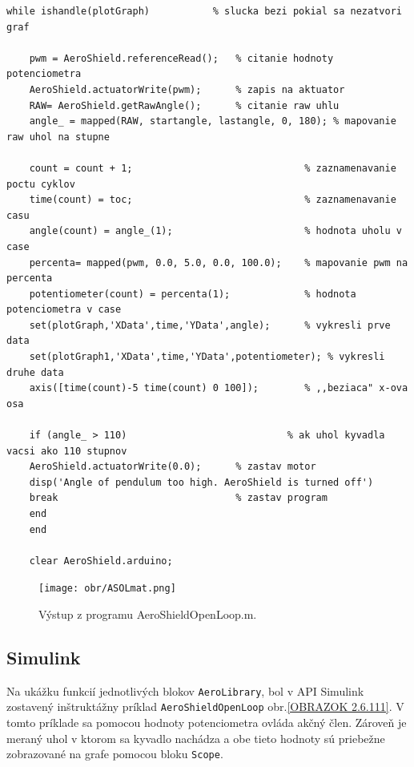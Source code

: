 \begin{lstlisting}[caption={AeroShield open loop, while cyklus.},captionpos=b]
	while ishandle(plotGraph)           % slucka bezi pokial sa nezatvori graf
	
	pwm = AeroShield.referenceRead();   % citanie hodnoty potenciometra
	AeroShield.actuatorWrite(pwm);      % zapis na aktuator
	RAW= AeroShield.getRawAngle();      % citanie raw uhlu
	angle_ = mapped(RAW, startangle, lastangle, 0, 180); % mapovanie raw uhol na stupne
	
	count = count + 1;                              % zaznamenavanie poctu cyklov
	time(count) = toc;                              % zaznamenavanie casu
	angle(count) = angle_(1);                       % hodnota uholu v case 
	percenta= mapped(pwm, 0.0, 5.0, 0.0, 100.0);    % mapovanie pwm na percenta
	potentiometer(count) = percenta(1);             % hodnota potenciometra v case
	set(plotGraph,'XData',time,'YData',angle);      % vykresli prve data
	set(plotGraph1,'XData',time,'YData',potentiometer); % vykresli druhe data  
	axis([time(count)-5 time(count) 0 100]);        % ,,beziaca" x-ova osa
	
	if (angle_ > 110)                            % ak uhol kyvadla vacsi ako 110 stupnov 
	AeroShield.actuatorWrite(0.0);      % zastav motor  
	disp('Angle of pendulum too high. AeroShield is turned off')
	break                               % zastav program
	end
	end  
	
	clear AeroShield.arduino;           
\end{lstlisting}

\begin{figure}[!tbh]
	\centering
	\texttt{[image: obr/ASOLmat.png]}
	\caption{Výstup z programu AeroShieldOpenLoop.m.}\label{OBRAZOK 3.2}
\end{figure}

\subsection{Simulink}


Na ukážku funkcií jednotlivých blokov \verb|AeroLibrary|, bol v API Simulink zostavený inštruktážny príklad \verb|AeroShieldOpenLoop| obr.\ref{OBRAZOK 2.6.111}. V tomto príklade sa pomocou hodnoty potenciometra ovláda akčný člen. Zároveň je meraný uhol v ktorom sa kyvadlo nachádza a obe tieto hodnoty sú priebežne zobrazované na grafe pomocou bloku \verb|Scope|. 

